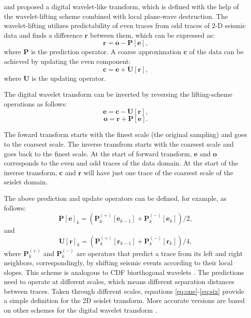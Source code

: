 \newpage
\onecolumn


\newpage
{}
\cite{fomel4} and \cite{seislet} proposed a digital wavelet-like transform, which is defined with the help of the wavelet-lifting scheme \cite[]{lifting} combined with local plane-wave destruction. The wavelet-lifting utilizes predictability of even traces from odd traces of 2-D seismic data and finds a difference $\mathbf{r}$ between them, which can be expressed as:
\begin{equation}
\label{eq:one}
\mathbf{r}=\mathbf{o}-\mathbf{P\left[e\right]},
\end{equation}
where $\mathbf{P}$ is the prediction operator.
A coarse approximation $\mathbf{c}$ of the data can be achieved by updating the even component:
\begin{equation}
\label{eq:two}
\mathbf{c}=\mathbf{e}+\mathbf{U\left[r\right]},
\end{equation}
where $\mathbf{U}$ is the updating operator.

The digital wavelet transform can be inverted by reversing the lifting-scheme operations as follows:
\begin{equation}
\label{eq:three}
\mathbf{e}=\mathbf{c}-\mathbf{U\left[r\right]},
\end{equation}
\begin{equation}
\label{eq:four}
\mathbf{o}=\mathbf{r}+\mathbf{P\left[e\right]}.
\end{equation}

The foward transform starts with the finest scale (the original sampling) and goes to the coarsest scale. The inverse transfrom starts with the coarsest scale and goes back to the finest scale. At the start of forward transform, $\mathbf{e}$ and $\mathbf{o}$ corresponds to the even and odd traces of the data domain. At the start of the inverse transform, $\mathbf{c}$ and $\mathbf{r}$ will have just one trace of the coarsest scale of the seislet domain.

The above prediction and update operators can be defined, for example, as follows:
\begin{equation}
\label{eq:five}
\mathbf{P}\left[\mathbf{e}\right]_k=\left(\mathbf{P}^{(+)}_k\left[\mathbf{e}_{k-1}\right]+\mathbf{P}^{(-)}_k\left[\mathbf{e}_k\right]\right)/2,
\end{equation}
and
\begin{equation}
\label{eq:six}
\mathbf{U}\left[\mathbf{r}\right]_k=\left(\mathbf{P}^{(+)}_k\left[\mathbf{r}_{k-1}\right]+\mathbf{P}^{(-)}_k\left[\mathbf{r}_k\right]\right)/4,
\end{equation}
where $\mathbf{P}^{(+)}_k$ and $\mathbf{P}^{(-)}_k$ are operators that predict a trace from its left and right neighbors, correspondingly, by shifting seismic events according to their local slopes. 
This scheme is analogous to CDF biorthogonal wavelets \cite[]{cohen1992}. The predictions need to operate at different scales, which means different separation distances between traces. Taken through different scales, equations \ref{eq:one}-\ref{eq:six} provide a simple definition for the 2D seislet transform.  More accurate versions are based on other schemes for the digital wavelet transform \cite[]{liuyang20091}.

